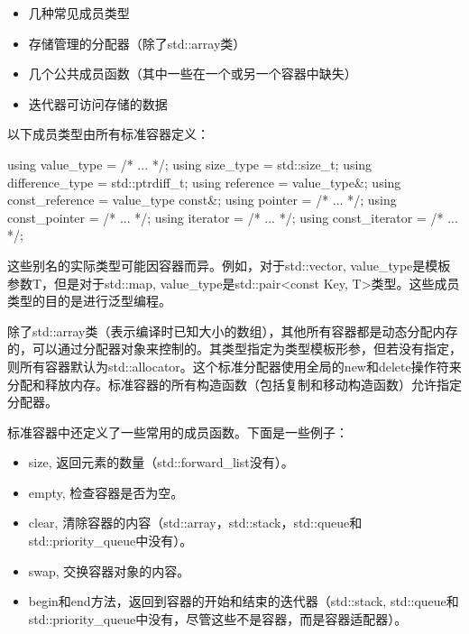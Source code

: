 \begin{itemize}
\item
几种常见成员类型

\item
存储管理的分配器（除了std::array类）

\item
几个公共成员函数（其中一些在一个或另一个容器中缺失）

\item
迭代器可访问存储的数据
\end{itemize}

以下成员类型由所有标准容器定义：

\begin{cpp}
using value_type = /* ... */;
using size_type = std::size_t;
using difference_type = std::ptrdiff_t;
using reference = value_type&;
using const_reference = value_type const&;
using pointer = /* ... */;
using const_pointer = /* ... */;
using iterator = /* ... */;
using const_iterator = /* ... */;
\end{cpp}

这些别名的实际类型可能因容器而异。例如，对于std::vector, value\_type是模板参数T，但是对于std::map, value\_type是std::pair<const Key, T>类型。这些成员类型的目的是进行泛型编程。

除了std::array类（表示编译时已知大小的数组），其他所有容器都是动态分配内存的，可以通过分配器对象来控制的。其类型指定为类型模板形参，但若没有指定，则所有容器默认为std::allocator。这个标准分配器使用全局的new和delete操作符来分配和释放内存。标准容器的所有构造函数（包括复制和移动构造函数）允许指定分配器。

标准容器中还定义了一些常用的成员函数。下面是一些例子：

\begin{itemize}
\item
size, 返回元素的数量（std::forward\_list没有）。

\item
empty, 检查容器是否为空。

\item
clear, 清除容器的内容（std::array，std::stack，std::queue和std::priority\_queue中没有）。

\item
swap, 交换容器对象的内容。

\item
begin和end方法，返回到容器的开始和结束的迭代器（std::stack, std::queue和std::priority\_queue中没有，尽管这些不是容器，而是容器适配器）。
\end{itemize}

